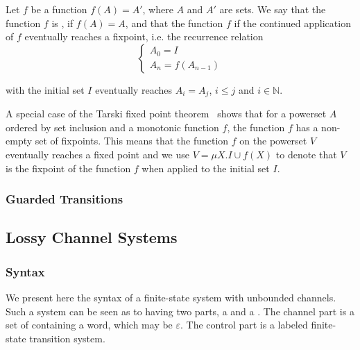 Let $f$ be a function $f(A) = A'$, where $A$ and $A'$ are sets. We say that the function $f$ is , if $f(A) = A$, and that the function $f$  if the continued application of $f$ eventually reaches a fixpoint, i.e. the recurrence relation
\[\begin{cases}
  A_0 = I\\
  A_n = f(A_{n-1})
\end{cases}\]

with the initial set $I$ eventually reaches $A_i = A_j$, $i \leq j$ and $i \in \mathbb{N}$.

A special case of the Tarski fixed point theorem~\cite{tarski} shows that for a powerset $A$ ordered by set inclusion and a monotonic function $f$, the function $f$ has a non-empty set of fixpoints. This means that the function $f$ on the powerset $V$ eventually reaches a fixed point and we use $V = \mu X.I \cup f(X)$ to denote that $V$ is the fixpoint of the function $f$ when applied to the initial set $I$.

\subsubsection{Guarded Transitions}

\subsection{Lossy Channel Systems}
\subsubsection{Syntax}
We present here the syntax of a finite-state system with unbounded channels. Such a system can be seen as to having two parts, a  and a . The channel part is a set of  containing a word, which may be $\varepsilon$. The control part is a labeled finite-state transition system.

